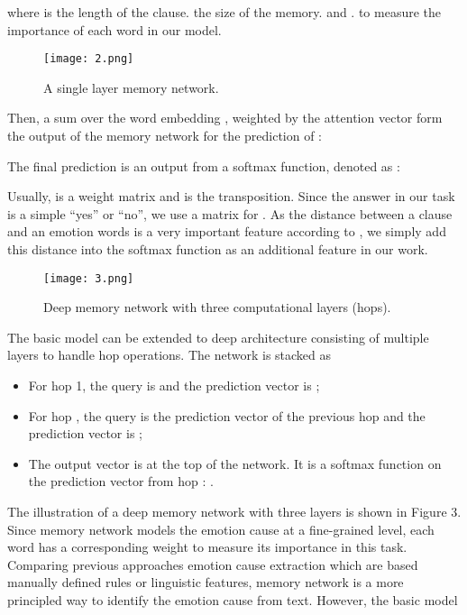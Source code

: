 \documentclass[11pt,letterpaper]{article}
\begin{document}
\begin{CJK*}{UTF8}{gbsn}
where  is the length of the clause. 
 the size of the memory.
  and . 
to measure the importance of each word in our model.

\begin{figure}[htbp]
\label{fig:figure2}
\texttt{[image: 2.png]}
\caption{A single layer memory network.}
\end{figure}

Then, a sum over the word embedding , weighted by the attention vector form the output of the memory network for the prediction of :


The final prediction is an output from a softmax function, denoted as :


Usually,  is a  weight matrix and  is the transposition. Since the answer in our task is a simple ``yes'' or ``no'', we use a  matrix for . As the distance between a clause and an emotion words is a very important feature according to \cite{gui2016event}, we simply add this distance into the softmax function as an additional feature in our work. 

\begin{figure}[htbp]
\label{fig:figure3}
\centering
\texttt{[image: 3.png]}
\caption{Deep memory network with three computational layers (hops).}
\end{figure}

The basic model can be extended to deep architecture consisting of multiple layers to handle  hop operations. The network is stacked as 


\begin{itemize}
\item For hop 1, the query is  and the prediction vector is ;
\item For hop , the query is the prediction vector of the previous hop and the prediction vector is ;
\item The output vector is at the top of the network. It is a softmax function on the prediction vector from hop : 
.
\end{itemize}


The illustration of a deep memory network with three layers is shown in Figure 3. Since  memory network models the emotion cause 
at a fine-grained level, each word has a corresponding weight to measure 
its importance in this task. Comparing  previous approaches  emotion cause extraction which are  based  manually defined rules or linguistic features,  memory network is a more principled way to identify the emotion cause from text. However, the basic  model 



\end{CJK*}
\end{document}
